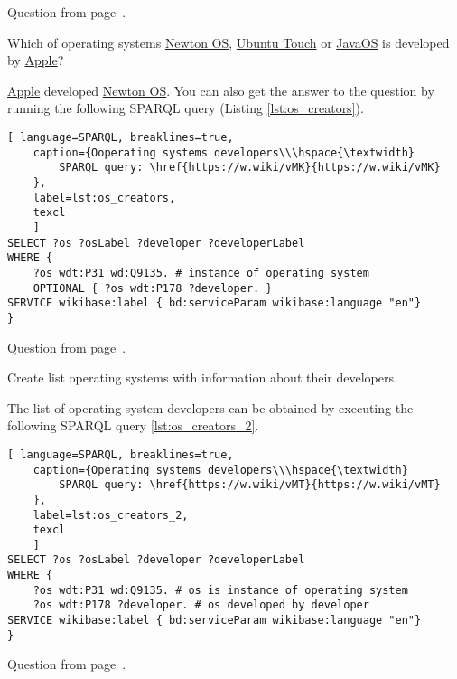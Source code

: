 Question from page~\pageref{lst:base_of_operating_systems}.

\begin{exercise}
	\label{answer:what_system_created}
	Which of operating systems
	\href{https://w.wiki/n8P}{Newton OS},
	\href{https://w.wiki/n8Q}{Ubuntu Touch} or
	\href{https://w.wiki/n8R}{JavaOS} is developed by
	\href{https://w.wiki/n8S}{Apple}?	
\end{exercise}
\href{https://w.wiki/n8S}{Apple}  developed  \href{https://w.wiki/n8P}{Newton OS}. You can also get the answer to the question by running the following SPARQL query (Listing \ref{lst:os_creators}).

\begin{lstlisting}[ language=SPARQL, breaklines=true, 
	caption={Ooperating systems developers\\\hspace{\textwidth}
		SPARQL query: \href{https://w.wiki/vMK}{https://w.wiki/vMK}
	},
	label=lst:os_creators,
	texcl 
	]
SELECT ?os ?osLabel ?developer ?developerLabel 
WHERE {
	?os wdt:P31 wd:Q9135. # instance of operating system
	OPTIONAL { ?os wdt:P178 ?developer. }
SERVICE wikibase:label { bd:serviceParam wikibase:language "en"}
}
\end{lstlisting}

Question from page~\pageref{lst:inception_time_of_operating_systems}.

\begin{exercise}
	\label{answer:os_and_developers}
	Create list operating systems with information about their developers.
\end{exercise}
The list of operating system developers can be obtained by executing the following SPARQL query \ref{lst:os_creators_2}.

\begin{lstlisting}[ language=SPARQL, breaklines=true, 
	caption={Operating systems developers\\\hspace{\textwidth}
		SPARQL query: \href{https://w.wiki/vMT}{https://w.wiki/vMT}
	},
	label=lst:os_creators_2,
	texcl 
	]
SELECT ?os ?osLabel ?developer ?developerLabel
WHERE {
	?os wdt:P31 wd:Q9135. # os is instance of operating system
	?os wdt:P178 ?developer. # os developed by developer
SERVICE wikibase:label { bd:serviceParam wikibase:language "en"}
}
\end{lstlisting}

Question from page~\pageref{tasks:operating_system_tasks}.

